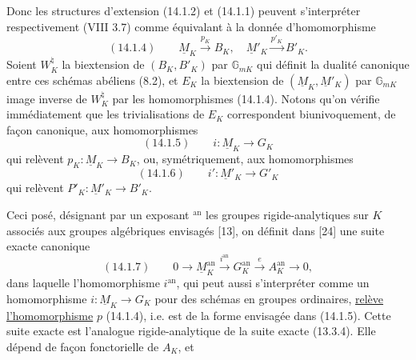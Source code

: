 Donc les structures d'extension (14.1.2) et (14.1.1) peuvent
s'interpréter respectivement (VIII 3.7) comme équivalant à la donnée
d'homomorphisme
\[
(14.1.4)\qquad\underline M_K\xrightarrow{p_K}B_K,\quad
\underline M'_K\xrightarrow{p'_K}B'_K.
\]
Soient $W_K^{\natural}$ la biextension de $(B_K,B'_K)$ par $\mathbb G_{mK}$ qui définit la
dualité canonique entre ces schémas abéliens (8.2), et $E_K$ la biextension
de $(\underline M_K,\underline M'_K)$ par $\mathbb G_{mK}$ image inverse de $W_K^{\natural}$ par les homomorphismes (14.1.4).
Notons qu'on vérifie immédiatement que les trivialisations de $E_K$ correspondent
biunivoquement, de façon canonique, aux homomorphismes
\[
(14.1.5)\qquad i:\underline M_K\longrightarrow G_K
\]
qui relèvent $p_K:\underline M_K\longrightarrow B_K$, ou, symétriquement, aux homomorphismes
\[
(14.1.6)\qquad i':\underline M'_K\longrightarrow G'_K
\]
qui relèvent $P'_K:\underline M'_K\longrightarrow B'_K$.

Ceci posé, désignant par un exposant $^{\mathrm{an}}$ les groupes rigide-analytiques
sur $K$ associés aux groupes algébriques envisagés [13],
on définit dans [24] une suite exacte canonique
\[
(14.1.7)\qquad0\longrightarrow\underline M_K^{\mathrm{an}}
\xrightarrow{i^{\mathrm{an}}}G_K^{\mathrm{an}}\xrightarrow{e}A_K^{\mathrm{an}}\longrightarrow0,
\]
dans laquelle l'homomorphisme $i^{\mathrm{an}}$, qui peut aussi s'interpréter comme
un homomorphisme $i:\underline M_K\longrightarrow G_K$ pour des schémas en groupes ordinaires,
\uline{relève l'homomorphisme} $p$ (14.1.4), i.e. est de la forme envisagée dans
(14.1.5). Cette suite exacte est l'analogue rigide-analytique de la
suite exacte (13.3.4). Elle dépend de façon fonctorielle de $A_K$, et
